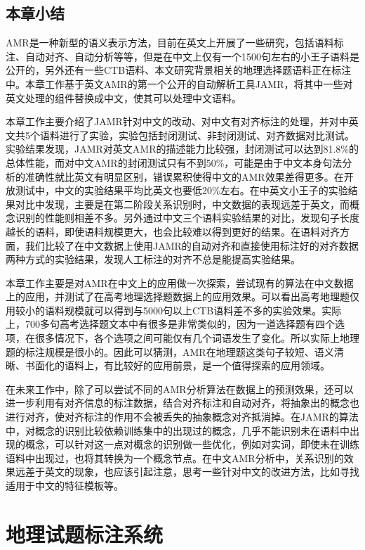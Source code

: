 \documentclass[master, winfont]{njuthesis}
\begin{document}
\section{本章小结}
AMR是一种新型的语义表示方法，目前在英文上开展了一些研究，包括语料标注、自动对齐、自动分析等等，但是在中文上仅有一个1500句左右的小王子语料是公开的，另外还有一些CTB语料、本文研究背景相关的地理选择题语料正在标注中。本章工作基于英文AMR的第一个公开的自动解析工具JAMR，将其中一些对英文处理的组件替换成中文，使其可以处理中文语料。

本章工作主要介绍了JAMR针对中文的改动、对中文有对齐标注的处理，并对中英文共5个语料进行了实验，实验包括封闭测试、非封闭测试、对齐数据对比测试。实验结果发现，JAMR对英文AMR的描述能力比较强，封闭测试可以达到81.8\%的总体性能，而对中文AMR的封闭测试只有不到50\%，可能是由于中文本身句法分析的准确性就比英文有明显区别，错误累积使得中文的AMR效果差得更多。在开放测试中，中文的实验结果平均比英文也要低20\%左右。在中英文小王子的实验结果对比中发现，主要是在第二阶段关系识别时，中文数据的表现远差于英文，而概念识别的性能则相差不多。另外通过中文三个语料实验结果的对比，发现句子长度越长的语料，即使语料规模更大，也会比较难以得到更好的结果。在语料对齐方面，我们比较了在中文数据上使用JAMR的自动对齐和直接使用标注好的对齐数据两种方式的实验结果，发现人工标注的对齐不总是能提高实验结果。

本章工作主要是对AMR在中文上的应用做一次探索，尝试现有的算法在中文数据上的应用，并测试了在高考地理选择题数据上的应用效果。可以看出高考地理题仅用较小的语料规模就可以得到与5000句以上CTB语料差不多的实验效果。实际上，700多句高考选择题文本中有很多是非常类似的，因为一道选择题有四个选项，在很多情况下，各个选项之间可能仅有几个词语发生了变化。所以实际上地理题的标注规模是很小的。因此可以猜测，AMR在地理题这类句子较短、语义清晰、书面化的语料上，有比较好的应用前景，是一个值得探索的应用领域。

在未来工作中，除了可以尝试不同的AMR分析算法在数据上的预测效果，还可以进一步利用有对齐信息的标注数据，结合对齐标注和自动对齐，将抽象出的概念也进行对齐，使对齐标注的作用不会被丢失的抽象概念对齐抵消掉。在JAMR的算法中，对概念的识别比较依赖训练集中的出现过的概念，几乎不能识别未在语料中出现的概念，可以针对这一点对概念的识别做一些优化，例如对实词，即使未在训练语料中出现过，也将其转换为一个概念节点。在中文AMR分析中，关系识别的效果远差于英文的现象，也应该引起注意，思考一些针对中文的改进方法，比如寻找适用于中文的特征模板等。

\chapter{地理试题标注系统}
\label{chapter:tagger}
\end{document}
